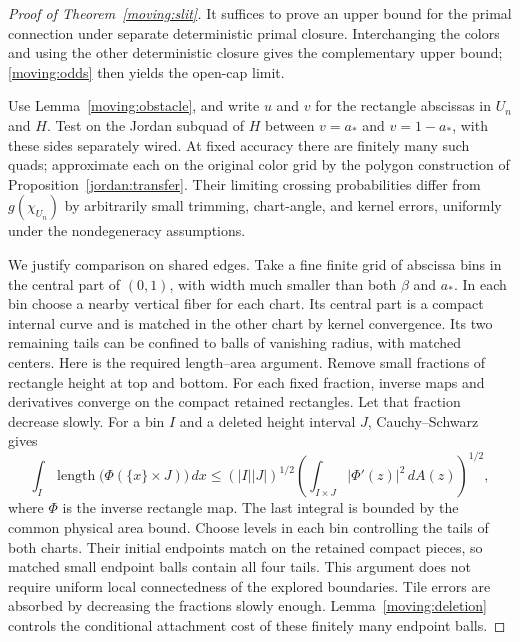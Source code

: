 \begin{proof}[Proof of Theorem~\ref{moving:slit}]
It suffices to prove an upper bound for the primal connection under
separate deterministic primal closure.  Interchanging the colors
and using the other deterministic closure gives the complementary
upper bound; \eqref{moving:odds} then yields the open-cap limit.

Use Lemma~\ref{moving:obstacle}, and write $u$ and $v$ for the rectangle
abscissas in $U_n$ and $H$.  Test on the Jordan subquad of $H$ between
$v=a_*$ and $v=1-a_*$, with these sides separately wired.  At fixed
accuracy there are finitely many such quads; approximate each on the
original color grid by the polygon construction of
Proposition~\ref{jordan:transfer}.  Their limiting crossing
probabilities differ from $g(\chi_{U_n})$ by arbitrarily small
trimming, chart-angle, and kernel errors, uniformly under the
nondegeneracy assumptions.

We justify comparison on shared edges.  Take a fine finite grid of
abscissa bins in the central part of $(0,1)$, with width much smaller
than both $\beta$ and $a_*$.  In each bin choose a nearby vertical
fiber for each chart.  Its central part is a compact internal curve
and is matched in the other chart by kernel convergence.  Its two
remaining tails can be confined to balls of vanishing radius,
with matched centers.  Here is the required length--area argument.
Remove small fractions of rectangle height at top and bottom.
For each fixed fraction, inverse maps and derivatives converge on
the compact retained rectangles.  Let that fraction decrease slowly.
For a bin $I$ and a deleted height interval $J$, Cauchy--Schwarz gives
\[
 \int_I\!\operatorname{length}\bigl(\Phi(\{x\}\times J)\bigr)\,dx
 \le (|I||J|)^{1/2}
       \left(\int_{I\times J}|\Phi'(z)|^2\,dA(z)\right)^{1/2},
\]
where $\Phi$ is the inverse rectangle map.  The last integral is
bounded by the common physical area bound.  Choose levels in each
bin controlling the tails of both charts.  Their initial endpoints
match on the retained compact pieces, so matched small endpoint
balls contain all four tails.  This argument does not require
uniform local connectedness of the explored boundaries.  Tile errors
are absorbed by decreasing the fractions slowly enough.
Lemma~\ref{moving:deletion} controls the conditional attachment cost
of these finitely many endpoint balls.


\end{proof}
